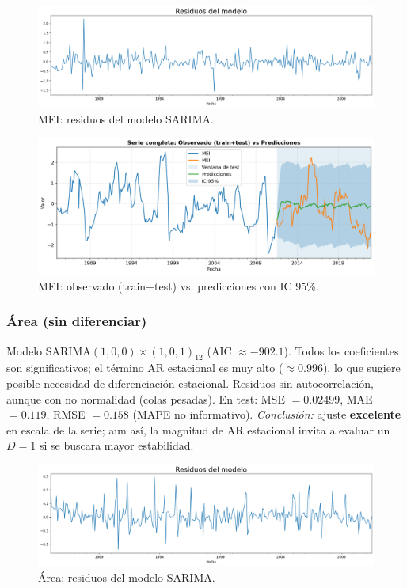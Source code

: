 \begin{figure}[H]\centering
\includegraphics[scale=.30]{Figures/res_sarima_mei.png}
\caption{MEI: residuos del modelo SARIMA.}
\label{fig:res_mei}
\end{figure}


\begin{figure}[H]\centering
\includegraphics[scale=.42]{Figures/pred_mei.png}
\caption{MEI: observado (train+test) vs. predicciones con IC 95\%.}
\label{fig:pred_mei}
\end{figure}


\subsubsection{Área (sin diferenciar)}
Modelo SARIMA$(1,0,0)\times(1,0,1)_{12}$ 
(AIC $\approx -902.1$). Todos los coeficientes son significativos; el término AR estacional
es muy alto ($\approx 0.996$), lo que sugiere posible necesidad de diferenciación
estacional. Residuos sin autocorrelación, aunque con no normalidad (colas pesadas).
En test: MSE $=0.02499$, MAE $=0.119$, RMSE $=0.158$ (MAPE no informativo).
\emph{Conclusión:} ajuste \textbf{excelente} en escala de la serie; aun así, la magnitud de
AR estacional invita a evaluar un $D=1$ si se buscara mayor estabilidad.
\vspace{0.3em}

\begin{figure}[H]\centering
\includegraphics[scale=.30]{Figures/res_sarima_area.png}
\caption{Área: residuos del modelo SARIMA.}
\label{fig:res_area}
\end{figure}




